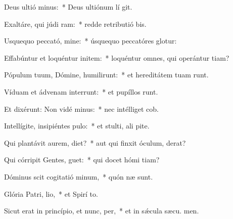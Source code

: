 \item Deus ultió minus:~* Deus ultiónum lí git.
\item Exaltáre, qui júdi ram:~* redde retributió bis.
\item Usquequo peccató, mine:~* úsquequo peccatóres glotur:
\item Effabúntur et loquéntur initem:~* loquéntur omnes, qui operántur tiam?
\item Pópulum tuum, Dómine, humilirunt:~* et hereditátem tuam runt.
\item Víduam et ádvenam interrunt:~* et pupíllos runt.
\item Et dixérunt: Non vidé minus:~* nec intélliget  cob.
\item Intellígite, insipiéntes  pulo:~* et stulti, ali pite.
\item Qui plantávit aurem,  diet?~* aut qui finxit óculum,  derat?
\item Qui córripit Gentes,  guet:~* qui docet hómi tiam?
\item Dóminus scit cogitatió minum,~* quón næ sunt.
\item Glória Patri,  lio,~* et Spirí to.
\item Sicut erat in princípio, et nunc,  per,~* et in sǽcula sæcu. men.
